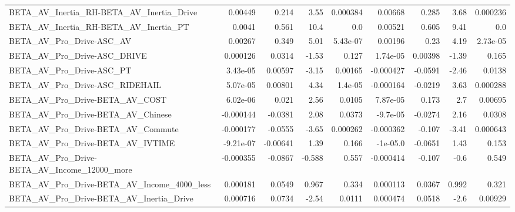 \begin{tabular}{lrrrrrrrr}
BETA\_AV\_Inertia\_RH-BETA\_AV\_Inertia\_Drive           &     0.00449 &        0.214 &     3.55 & 0.000384 &    0.00668 &       0.285 &         3.68 &      0.000236 \\
BETA\_AV\_Inertia\_RH-BETA\_AV\_Inertia\_PT              &      0.0041 &        0.561 &     10.4 &      0.0 &    0.00521 &       0.605 &         9.41 &           0.0 \\
BETA\_AV\_Pro\_Drive-ASC\_AV                           &     0.00267 &        0.349 &     5.01 & 5.43e-07 &    0.00196 &        0.23 &         4.19 &      2.73e-05 \\
BETA\_AV\_Pro\_Drive-ASC\_DRIVE                        &    0.000126 &       0.0314 &    -1.53 &    0.127 &   1.74e-05 &     0.00398 &        -1.39 &         0.165 \\
BETA\_AV\_Pro\_Drive-ASC\_PT                           &    3.43e-05 &      0.00597 &    -3.15 &  0.00165 &  -0.000427 &     -0.0591 &        -2.46 &        0.0138 \\
BETA\_AV\_Pro\_Drive-ASC\_RIDEHAIL                     &    5.07e-05 &      0.00801 &     4.34 &  1.4e-05 &  -0.000164 &     -0.0219 &         3.63 &      0.000288 \\
BETA\_AV\_Pro\_Drive-BETA\_AV\_COST                     &    6.02e-06 &        0.021 &     2.56 &   0.0105 &   7.87e-05 &       0.173 &          2.7 &       0.00695 \\
BETA\_AV\_Pro\_Drive-BETA\_AV\_Chinese                  &   -0.000144 &      -0.0381 &     2.08 &   0.0373 &   -9.7e-05 &     -0.0274 &         2.16 &        0.0308 \\
BETA\_AV\_Pro\_Drive-BETA\_AV\_Commute                  &   -0.000177 &      -0.0555 &    -3.65 & 0.000262 &  -0.000362 &      -0.107 &        -3.41 &      0.000643 \\
BETA\_AV\_Pro\_Drive-BETA\_AV\_IVTIME                   &   -9.21e-07 &     -0.00641 &     1.39 &    0.166 &   -1e-05.0 &     -0.0651 &         1.43 &         0.153 \\
BETA\_AV\_Pro\_Drive-BETA\_AV\_Income\_12000\_more        &   -0.000355 &      -0.0867 &   -0.588 &    0.557 &  -0.000414 &      -0.107 &         -0.6 &         0.549 \\
BETA\_AV\_Pro\_Drive-BETA\_AV\_Income\_4000\_less         &    0.000181 &       0.0549 &    0.967 &    0.334 &   0.000113 &      0.0367 &        0.992 &         0.321 \\
BETA\_AV\_Pro\_Drive-BETA\_AV\_Inertia\_Drive            &    0.000716 &       0.0734 &    -2.54 &   0.0111 &   0.000474 &      0.0518 &         -2.6 &       0.00929 \\

\end{tabular}
